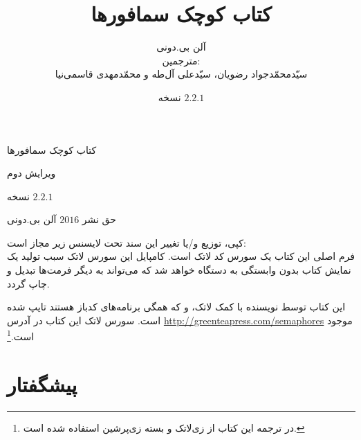 \documentclass{book}
\title{کتاب کوچک سمافورها}
\author{آلن بی.دونی\\[2cm]
مترجمین:\\
سیّدمحمّدجواد رضویان، سیّدعلی آل‌طه و محمّدمهدی قاسمی‌نیا}
\newcommand{\theversion}{نسخه $2.2.1$}
\begin{document}

\date {\theversion}
\maketitle

\vspace{2in}
\begin{center}
{\Large کتاب کوچک سمافورها}

ویرایش دوم
\vspace{0.25in}

\theversion
\vspace{0.25in}

حق نشر $2016$ آلن بی.دونی
\end{center}
\vspace{0.25in}

کپی، توزیع و/یا تغییر این سند تحت لایسنس زیر مجاز است: \\
فرم اصلی این کتاب یک سورس کد لاتک است. کامپایل این سورس لاتک سبب تولید یک نمایش کتاب بدون وابستگی به دستگاه خواهد شد 
که می‌تواند به دیگر فرمت‌ها تبدیل و چاپ گردد. 

این کتاب توسط نویسنده با کمک لاتک،  و  که همگی برنامه‌های کدباز هستند تایپ شده است. 
سورس لاتک این کتاب در آدرس \url{http://greenteapress.com/semaphores} موجود است.\footnote{در ترجمه این کتاب از زی‌لاتک و بسته 
زی‌پرشین استفاده شده است.}


\frontmatter

\chapter{پیشگفتار}
\end{document}
